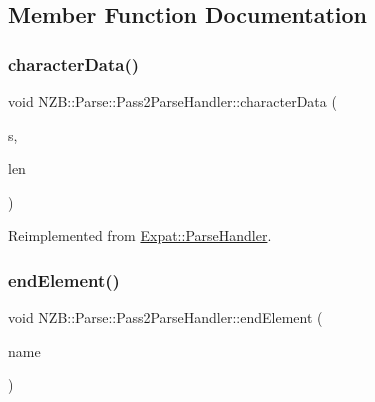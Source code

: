 \subsection{Member Function Documentation}
\hypertarget{class_n_z_b_1_1_parse_1_1_pass2_parse_handler_adafb3081bcec7653a9b0b3ce8f25a1a5}{}\label{class_n_z_b_1_1_parse_1_1_pass2_parse_handler_adafb3081bcec7653a9b0b3ce8f25a1a5} 
\subsubsection{\texorpdfstring{character\+Data()}{characterData()}}
{\footnotesize\ttfamily void N\+Z\+B\+::\+Parse\+::\+Pass2\+Parse\+Handler\+::character\+Data (\begin{DoxyParamCaption}\item[{const X\+M\+L\+\_\+\+Char $\ast$}]{s,  }\item[{int}]{len }\end{DoxyParamCaption})\hspace{0.3cm}{\ttfamily [virtual]}}



Reimplemented from \hyperlink{class_expat_1_1_parse_handler_af3f6effd1ab8b85ec007b981f83d130e}{Expat\+::\+Parse\+Handler}.

\hypertarget{class_n_z_b_1_1_parse_1_1_pass2_parse_handler_aadec64ab8a4f9bfd7f3b40bd76cce7aa}{}\label{class_n_z_b_1_1_parse_1_1_pass2_parse_handler_aadec64ab8a4f9bfd7f3b40bd76cce7aa} 
\subsubsection{\texorpdfstring{end\+Element()}{endElement()}}
{\footnotesize\ttfamily void N\+Z\+B\+::\+Parse\+::\+Pass2\+Parse\+Handler\+::end\+Element (\begin{DoxyParamCaption}\item[{const X\+M\+L\+\_\+\+Char $\ast$}]{name }\end{DoxyParamCaption})\hspace{0.3cm}{\ttfamily [virtual]}}



